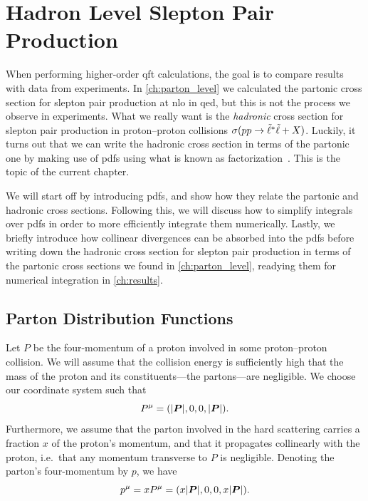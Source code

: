 \chapter{Hadron Level Slepton Pair Production}\label{ch:hadron_level}

When performing higher-order \gls{qft} calculations, the goal is to compare results with data from experiments.
In \cref{ch:parton_level} we calculated the partonic cross section for slepton pair production at \gls{nlo} in \gls{qed}, but this is not the process we observe in experiments.
What we really want is the \emph{hadronic} cross section for slepton pair production in proton--proton collisions $\sigma(pp \to {\tilde{\ell}}^*{\tilde{\ell}} + X)$.
Luckily, it turns out that we can write the hadronic cross section in terms of the partonic one by making use of \glspl{pdf} using what is known as factorization~\cite{Ellis:1996mzs}.
This is the topic of the current chapter.

We will start off by introducing \glspl{pdf}, and show how they relate the partonic and hadronic cross sections.
Following this, we will discuss how to simplify integrals over \glspl{pdf} in order to more efficiently integrate them numerically.
Lastly, we briefly introduce how collinear divergences can be absorbed into the \glspl{pdf} before writing down the hadronic cross section for slepton pair production in terms of the partonic cross sections we found in \cref{ch:parton_level}, readying them for numerical integration in \cref{ch:results}.



\section{Parton Distribution Functions}
Let $P$ be the four-momentum of a proton involved in some proton--proton collision. We will assume that the collision energy is sufficiently high that the mass of the proton and its constituents---the partons---are negligible. We choose our coordinate system such that
\begin{equation}
    P^\mu = (\lvert\boldsymbol{P}\rvert, 0, 0, \lvert\boldsymbol{P}\rvert).
\end{equation}
Furthermore, we assume that the parton involved in the hard scattering carries a fraction $x$ of the proton's momentum, and that it propagates collinearly with the proton, i.e.\ that any momentum transverse to $P$ is negligible. Denoting the parton's four-momentum by $p$, we have
\begin{equation}
    p^\mu = xP^\mu = (x\lvert\boldsymbol{P}\rvert, 0, 0, x\lvert\boldsymbol{P}\rvert).
\end{equation}

